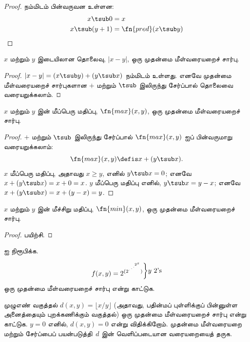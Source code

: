 \documentclass[../../../include/open-logic-section]{subfiles}
\begin{document}
\begin{proof}
  நம்மிடம் பின்வருவன உள்ளன:
  \begin{align*}
    x \tsub 0 & = x\\
    x \tsub (y+1) & = \fn{pred}(x \tsub y) 
  \end{align*}
\end{proof}

\begin{prop}
 $x$ மற்றும் $y$ இடையிலான தொலைவு, $\left|x-y\right|$, ஒரு
 முதன்மை மீள்வரையறைச் சார்பு.
\end{prop}

\begin{proof}
  $\left| x-y \right| = (x \tsub y) + (y \tsub x)$ நம்மிடம்
  உள்ளது. எனவே முதன்மை மீள்வரையறைச் சார்புகளான $+$ மற்றும்
  $\tsub$ இலிருந்து சேர்ப்பால் தொலைவை வரையறுக்கலாம்.
\end{proof}

\begin{prop}
  $x$ மற்றும் $y$ இன் மீப்பெரு மதிப்பு, $\fn{max}(x,y)$, ஒரு
  முதன்மை மீள்வரையறைச் சார்பு.
\end{prop}

\begin{proof}
  $+$ மற்றும் $\tsub$ இலிருந்து சேர்ப்பால் $\fn{max}(x,y)$ ஐப்
  பின்வருமாறு வரையறுக்கலாம்:
  \[
  \fn{max}(x,y) \defis x + (y \tsub x).
  \]
  $x$ மீப்பெரு மதிப்பு, அதாவது $x \ge y$, எனில்
  $y \tsub x = 0$; எனவே $x + (y \tsub x) = x + 0 = x$.
  $y$ மீப்பெரு மதிப்பு எனில், $y \tsub x = y - x$; எனவே
  $x + (y \tsub x) = x + (y - x) = y$.
\end{proof}

\begin{prop}
  $x$ மற்றும் $y$ இன் மீச்சிறு மதிப்பு, $\fn{min}(x,y)$, ஒரு
  முதன்மை மீள்வரையறைச் சார்பு.
\end{prop}

\begin{proof}
  பயிற்சி.
\end{proof}

\begin{prob}
   ஐ நிரூபிக்க.
\end{prob}

\begin{prob}
\[
f(x, y) =
2^{(2^{\iddots^{2^{x}}})}\raisebox{1ex}{\bigg\rbrace}
\raisebox{1ex}{\text {$y$ $2$'s}}\] ஒரு முதன்மை
மீள்வரையறைச் சார்பு என்று காட்டுக.
\end{prob}

\begin{prob}
முழுஎண் வகுத்தல் $d(x, y) = \lfloor x/y \rfloor$ (அதாவது, பதின்மப்
புள்ளிக்குப் பின்னுள்ள அனைத்தையும் புறக்கணிக்கும் வகுத்தல்) ஒரு
முதன்மை மீள்வரையறைச் சார்பு என்று காட்டுக. $y = 0$ எனில்,
$d(x, y) = 0$ என்று விதிக்கிறோம். முதன்மை மீள்வரையறை மற்றும்
சேர்ப்பைப் பயன்படுத்தி~$d$ இன் வெளிப்படையான வரையறையைத் தருக.
\end{prob}
\end{document}
